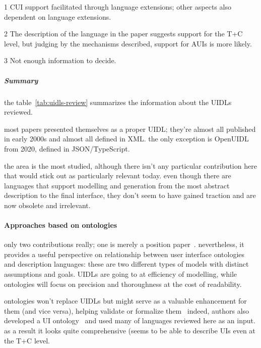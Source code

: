 \begin{table}[]
\begin{threeparttable}[b]
\begin{tabularx}{\textwidth}{lrCCC}
            \bottomrule
        \end{tabularx}
        \begin{tablenotes}
            \item[1] CUI support facilitated through language extensions;
                     other aspects also dependent on language extensions.
            \item[2] The description of the language in the paper suggests support for the T+C level, but judging by the mechanisms described, support for AUIs is more likely.
            \item[3] Not enough information to decide.
        \end{tablenotes}
    \end{threeparttable}
\end{table}

\subparagraph{Summary}
the table~\ref{tab:uidls-review} summarizes the information about the UIDLs reviewed.

most papers presented themselves as a proper UIDL;
they're almost all published in early 2000s and almost all defined in XML\@.
the only exception is OpenUIDL from 2020, defined in JSON/TypeScript.

the area is the most studied, although there isn't any particular contribution here that would stick out as particularly relevant today.
even though there are languages that support modelling and generation from the most abstract description to the final interface, they don't seem to have gained traction and are now obsolete and irrelevant.


\paragraph{Approaches based on ontologies}

only two contributions really;
one is merely a position paper~\cite{paulheim_formal_2011}.
nevertheless, it provides a useful perspective on relationship between user interface ontologies and description languages:
these are two different types of models with distinct assumptions and goals.
UIDLs are going to at efficiency of modelling, while ontologies will focus on precision and thoroughness at the cost of readability.

ontologies won't replace UIDLs but might serve as a valuable enhancement for them (and vice versa), helping validate or formalize them \textemdash\ indeed, authors also developed a UI ontology~\cite{paulheim_ui2ont_2013} and used many of languages reviewed here as an input.
as a result it looks quite comprehensive (seems to be able to describe UIs even at the T+C level.

